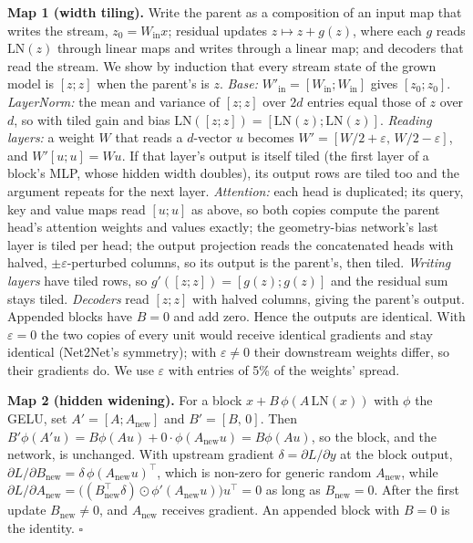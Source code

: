 \documentclass{article}
\begin{document}
\textbf{Map 1 (width tiling).} Write the parent as a composition of an input map that writes the stream,
$z_0=W_{\text{in}}x$; residual updates $z\mapsto z+g(z)$, where each $g$ reads $\mathrm{LN}(z)$ through linear maps and
writes through a linear map; and decoders that read the stream. We show by induction that every stream state of the
grown model is $[z;z]$ when the parent's is $z$. \emph{Base:} $W'_{\text{in}}=[W_{\text{in}};W_{\text{in}}]$ gives
$[z_0;z_0]$. \emph{LayerNorm:} the mean and variance of $[z;z]$ over $2d$ entries equal those of $z$ over $d$, so with
tiled gain and bias $\mathrm{LN}([z;z])=[\mathrm{LN}(z);\mathrm{LN}(z)]$. \emph{Reading layers:} a weight $W$ that reads
a $d$-vector $u$ becomes $W'=[W/2+\varepsilon,\,W/2-\varepsilon]$, and $W'[u;u]=Wu$. If that layer's output is itself
tiled (the first layer of a block's MLP, whose hidden width doubles), its output rows are tiled too and the argument
repeats for the next layer. \emph{Attention:} each head is duplicated; its query, key and value maps read $[u;u]$ as
above, so both copies compute the parent head's attention weights and values exactly; the geometry-bias network's last
layer is tiled per head; the output projection reads the concatenated heads with halved, $\pm\varepsilon$-perturbed
columns, so its output is the parent's, then tiled. \emph{Writing layers} have tiled rows, so $g'([z;z])=[g(z);g(z)]$
and the residual sum stays tiled. \emph{Decoders} read $[z;z]$ with halved columns, giving the parent's output.
Appended blocks have $B=0$ and add zero. Hence the outputs are identical. With $\varepsilon=0$ the two copies of every
unit would receive identical gradients and stay identical (Net2Net's symmetry); with $\varepsilon\neq0$ their
downstream weights differ, so their gradients do. We use $\varepsilon$ with entries of 5\% of the weights' spread.

\textbf{Map 2 (hidden widening).} For a block $x+B\,\phi(A\,\mathrm{LN}(x))$ with $\phi$ the GELU, set
$A'=[A;A_{\text{new}}]$ and $B'=[B,\,0]$. Then $B'\phi(A'u)=B\phi(Au)+0\cdot\phi(A_{\text{new}}u)=B\phi(Au)$, so the block,
and the network, is unchanged. With upstream gradient $\delta=\partial L/\partial y$ at the block output,
$\partial L/\partial B_{\text{new}}=\delta\,\phi(A_{\text{new}}u)^{\top}$, which is non-zero for generic random
$A_{\text{new}}$, while $\partial L/\partial A_{\text{new}}=\big((B_{\text{new}}^{\top}\delta)\odot\phi'(A_{\text{new}}u)\big)u^{\top}=0$
as long as $B_{\text{new}}=0$. After the first update $B_{\text{new}}\neq0$, and $A_{\text{new}}$ receives gradient. An
appended block with $B=0$ is the identity. $\square$
\end{document}
